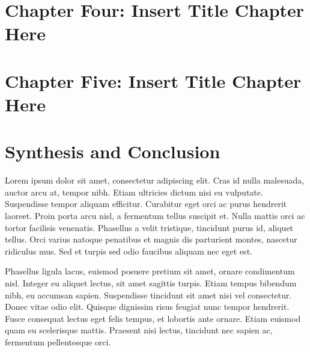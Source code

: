 \documentclass[]{article}
\numberwithin{equation}{section}
\begin{document}
\renewcommand{\thefigure}{3.\arabic{figure}}
\setcounter{figure}{0}
\renewcommand{\thetable}{3.\arabic{table}}
\setcounter{table}{0}
\renewcommand{\theequation}{3.\arabic{equation}}
\setcounter{equation}{0}

\clearpage

\hypertarget{chapter-four-insert-title-chapter-here}{%
\section{Chapter Four: Insert Title Chapter Here}\label{chapter-four-insert-title-chapter-here}}

\renewcommand{\thefigure}{4.\arabic{figure}}
\setcounter{figure}{0}
\renewcommand{\thetable}{4.\arabic{table}}
\setcounter{table}{0}
\renewcommand{\theequation}{4.\arabic{equation}}
\setcounter{equation}{0}

\clearpage

\hypertarget{chapter-five-insert-title-chapter-here}{%
\section{Chapter Five: Insert Title Chapter Here}\label{chapter-five-insert-title-chapter-here}}

\renewcommand{\thefigure}{5.\arabic{figure}}
\setcounter{figure}{0}
\renewcommand{\thetable}{5.\arabic{table}}
\setcounter{table}{0}
\renewcommand{\theequation}{5.\arabic{equation}}
\setcounter{equation}{0}

\clearpage

\hypertarget{synthesis-and-conclusion}{%
\section{Synthesis and Conclusion}\label{synthesis-and-conclusion}}

Lorem ipsum dolor sit amet, consectetur adipiscing elit. Cras id nulla malesuada, auctor arcu at, tempor nibh. Etiam ultricies dictum nisi eu vulputate. Suspendisse tempor aliquam efficitur. Curabitur eget orci ac purus hendrerit laoreet. Proin porta arcu nisl, a fermentum tellus suscipit et. Nulla mattis orci ac tortor facilisis venenatis. Phasellus a velit tristique, tincidunt purus id, aliquet tellus. Orci varius natoque penatibus et magnis dis parturient montes, nascetur ridiculus mus. Sed et turpis sed odio faucibus aliquam nec eget est.

Phasellus ligula lacus, euismod posuere pretium sit amet, ornare condimentum nisl. Integer eu aliquet lectus, sit amet sagittis turpis. Etiam tempus bibendum nibh, eu accumsan sapien. Suspendisse tincidunt sit amet nisi vel consectetur. Donec vitae odio elit. Quisque dignissim risus feugiat nunc tempor hendrerit. Fusce consequat lectus eget felis tempus, et lobortis ante ornare. Etiam euismod quam eu scelerisque mattis. Praesent nisi lectus, tincidunt nec sapien ac, fermentum pellentesque orci.
\end{document}
